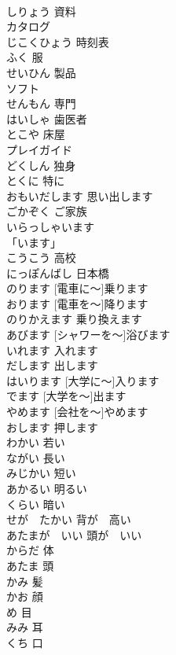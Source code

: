 \documentclass[8pt]{extreport}
\begin{document}
\begin{CJK}{UTF8}{min}
\\	しりょう	資料	
\\	カタログ			
\\	じこくひょう	時刻表	
\\	ふく	服	
\\	せいひん	製品	
\\	ソフト			
\\	せんもん	専門	
\\	はいしゃ	歯医者	
\\	とこや	床屋	
\\	プレイガイド			
\\	どくしん	独身	
\\	とくに	特に	
\\	おもいだします	思い出します	
\\	ごかぞく	ご家族	
\\	いらっしゃいます			
\\	「います」		
\\	こうこう	高校	
\\	にっぽんばし	日本橋	
\\	[でんしゃに～] のります	[電車に～]乗ります	
\\	[でんしゃを～]おります	[電車を～]降ります	
\\	のりかえます	乗り換えます	
\\	[シャワーを～]あびます	[シャワーを～]浴びます	
\\	いれます	入れます	
\\	だします	出します	
\\	[だいがくに～] はいります	[大学に～]入ります	
\\	[だいがくを～] でます	[大学を～]出ます	
\\	[かいしゃを～]やめます	[会社を～]やめます	
\\	おします	押します	
\\	わかい	若い	
\\	ながい	長い	
\\	みじかい	短い	
\\	あかるい	明るい	
\\	くらい	暗い	
\\	せが　たかい	背が　高い	
\\	あたまが　いい	頭が　いい	
\\	からだ	体	
\\	あたま	頭	
\\	かみ	髪	
\\	かお	顔	
\\	め	目	
\\	みみ	耳	
\\	くち	口	

\end{CJK}
\end{document}
